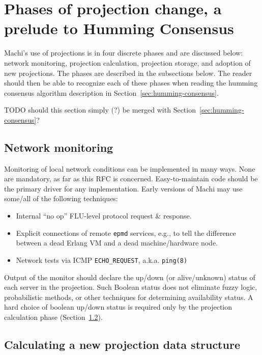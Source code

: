 \documentclass[preprint,10pt]{sigplanconf}
\begin{document}
\section{Phases of projection change, a prelude to Humming Consensus}
\label{sec:phases-of-projection-change}

Machi's use of projections is in four discrete phases and are
discussed below: network monitoring,
projection calculation, projection storage, and
adoption of new projections.  The phases are described in the
subsections below.  The reader should then be able to recognize each
of these phases when reading the humming consensus algorithm
description in Section~\ref{sec:humming-consensus}.

TODO should this section simply (?) be merged with Section~\ref{sec:humming-consensus}?

\subsection{Network monitoring}
\label{sub:network-monitoring}

Monitoring of local network conditions can be implemented in many
ways.  None are mandatory, as far as this RFC is concerned.
Easy-to-maintain code should be the primary driver for any
implementation.  Early versions of Machi may use some/all of the
following techniques:

\begin{itemize}
\item Internal ``no op'' FLU-level protocol request \& response.
\item Explicit connections of remote {\tt epmd} services, e.g., to
tell the difference between a dead Erlang VM and a dead
machine/hardware node.
\item Network tests via ICMP {\tt ECHO\_REQUEST}, a.k.a. {\tt ping(8)}
\end{itemize}

Output of the monitor should declare the up/down (or
alive/unknown) status of each server in the projection.  Such
Boolean status does not eliminate fuzzy logic, probabilistic
methods, or other techniques for determining availability status.
A hard choice of boolean up/down status
is required only by the projection calculation phase
(Section~\ref{sub:projection-calculation}).

\subsection{Calculating a new projection data structure}
\label{sub:projection-calculation}
\end{document}
